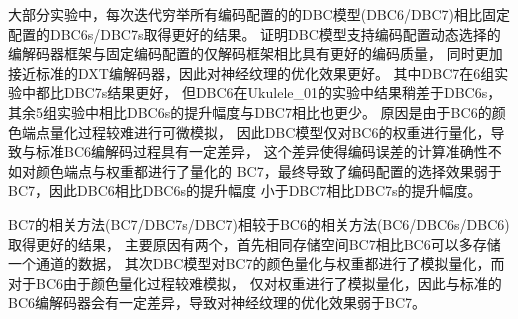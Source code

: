 大部分实验中，每次迭代穷举所有编码配置的的DBC模型(DBC6/DBC7)相比固定配置的DBC6s/DBC7s取得更好的结果。
证明DBC模型支持编码配置动态选择的编解码器框架与固定编码配置的仅解码框架相比具有更好的编码质量，
同时更加接近标准的DXT编解码器，因此对神经纹理的优化效果更好。
其中DBC7在6组实验中都比DBC7s结果更好，
但DBC6在Ukulele\_01的实验中结果稍差于DBC6s，
其余5组实验中相比DBC6s的提升幅度与DBC7相比也更少。
原因是由于BC6的颜色端点量化过程较难进行可微模拟，
因此DBC模型仅对BC6的权重进行量化，导致与标准BC6编解码过程具有一定差异，
这个差异使得编码误差的计算准确性不如对颜色端点与权重都进行了量化的
BC7，最终导致了编码配置的选择效果弱于BC7，因此DBC6相比DBC6s的提升幅度
小于DBC7相比DBC7s的提升幅度。

BC7的相关方法(BC7/DBC7s/DBC7)相较于BC6的相关方法(BC6/DBC6s/DBC6)取得更好的结果，
主要原因有两个，首先相同存储空间BC7相比BC6可以多存储一个通道的数据，
其次DBC模型对BC7的颜色量化与权重都进行了模拟量化，而对于BC6由于颜色量化过程较难模拟，
仅对权重进行了模拟量化，因此与标准的BC6编解码器会有一定差异，导致对神经纹理的优化效果弱于BC7。


